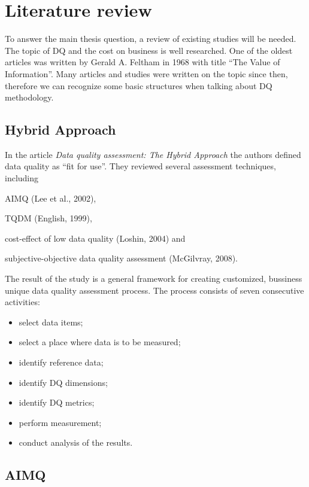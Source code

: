 \chapter{Literature review}\label{ch:literature-review}

To answer the main thesis question, a review of existing studies will be needed.
The topic of DQ and the cost on business is well researched.
One of the oldest articles was written by Gerald A. Feltham in 1968 with title \enquote{The Value of Information}.
Many articles and studies were written on the topic since then, therefore we can recognize some basic structures when talking about DQ methodology.

\section{Hybrid Approach}

In the article \textit{Data quality assessment: The Hybrid Approach} the authors defined data quality as \enquote{fit for use}.
They reviewed several assessment techniques, including
\begin{enumerate*}[label=(\roman*)]
    \item AIMQ (Lee et al., 2002),
    \item TQDM (English, 1999),
    \item cost-effect of low data quality (Loshin, 2004) and
    \item subjective-objective data quality assessment (McGilvray, 2008).
\end{enumerate*}

The result of the study is a general framework for creating customized, bussiness unique data quality assessment process.
The process consists of seven consecutive activities:

\begin{itemize}
    \item select data items;
    \item select a place where data is to be measured;
    \item identify reference data;
    \item identify DQ dimensions;
    \item identify DQ metrics;
    \item perform measurement;
    \item conduct analysis of the results.
\end{itemize}

\section{AIMQ}

